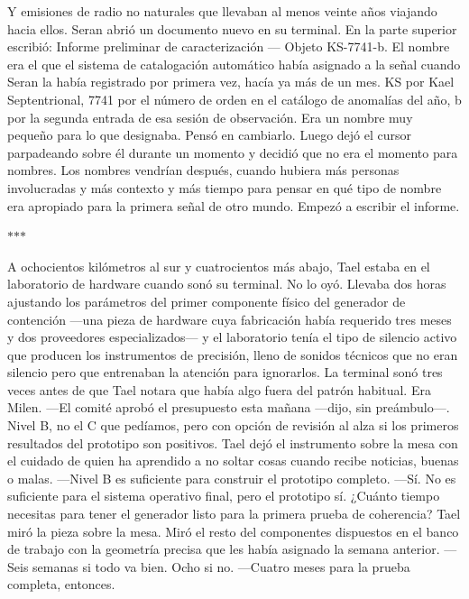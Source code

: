 \documentclass[11pt,a5paper,twoside]{book}
\begin{document}
Y emisiones de radio no naturales que llevaban al menos veinte años viajando hacia ellos.
Seran abrió un documento nuevo en su terminal. En la parte superior escribió: Informe preliminar de caracterización — Objeto KS-7741-b. El nombre era el que el sistema de catalogación automático había asignado a la señal cuando Seran la había registrado por primera vez, hacía ya más de un mes. KS por Kael Septentrional, 7741 por el número de orden en el catálogo de anomalías del año, b por la segunda entrada de esa sesión de observación.
Era un nombre muy pequeño para lo que designaba.
Pensó en cambiarlo. Luego dejó el cursor parpadeando sobre él durante un momento y decidió que no era el momento para nombres. Los nombres vendrían después, cuando hubiera más personas involucradas y más contexto y más tiempo para pensar en qué tipo de nombre era apropiado para la primera señal de otro mundo.
Empezó a escribir el informe.
\vspace{1.5em}
\begin{center}$\ast$\quad$\ast$\quad$\ast$\end{center}
\vspace{1.5em}
A ochocientos kilómetros al sur y cuatrocientos más abajo, Tael estaba en el laboratorio de hardware cuando sonó su terminal.
No lo oyó. Llevaba dos horas ajustando los parámetros del primer componente físico del generador de contención —una pieza de hardware cuya fabricación había requerido tres meses y dos proveedores especializados— y el laboratorio tenía el tipo de silencio activo que producen los instrumentos de precisión, lleno de sonidos técnicos que no eran silencio pero que entrenaban la atención para ignorarlos. La terminal sonó tres veces antes de que Tael notara que había algo fuera del patrón habitual.
Era Milen.
—El comité aprobó el presupuesto esta mañana —dijo, sin preámbulo—. Nivel B, no el C que pedíamos, pero con opción de revisión al alza si los primeros resultados del prototipo son positivos.
Tael dejó el instrumento sobre la mesa con el cuidado de quien ha aprendido a no soltar cosas cuando recibe noticias, buenas o malas.
—Nivel B es suficiente para construir el prototipo completo.
—Sí. No es suficiente para el sistema operativo final, pero el prototipo sí. ¿Cuánto tiempo necesitas para tener el generador listo para la primera prueba de coherencia?
Tael miró la pieza sobre la mesa. Miró el resto del componentes dispuestos en el banco de trabajo con la geometría precisa que les había asignado la semana anterior.
—Seis semanas si todo va bien. Ocho si no.
—Cuatro meses para la prueba completa, entonces.
\end{document}
